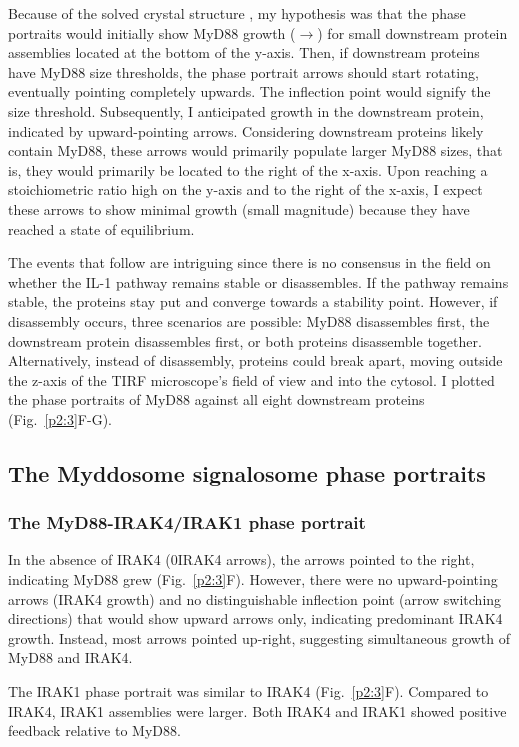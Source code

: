Because of the solved crystal structure \autocite{Lin_2010}, my hypothesis was that the phase portraits would initially show MyD88 growth ($\rightarrow$) for small downstream protein assemblies located at the bottom of the y-axis. Then, if downstream proteins have MyD88 size thresholds, the phase portrait arrows should start rotating, eventually pointing completely upwards. The inflection point would signify the size threshold. Subsequently, I anticipated growth in the downstream protein, indicated by upward-pointing arrows. Considering downstream proteins likely contain MyD88, these arrows would primarily populate larger MyD88 sizes, that is, they would primarily be located to the right of the x-axis. Upon reaching a stoichiometric ratio high on the y-axis and to the right of the x-axis, I expect these arrows to show minimal growth (small magnitude) because they have reached a state of equilibrium.

The events that follow are intriguing since there is no consensus in the field on whether the IL-1 pathway remains stable or disassembles. If the pathway remains stable, the proteins stay put and converge towards a stability point. However, if disassembly occurs, three scenarios are possible: MyD88 disassembles first, the downstream protein disassembles first, or both proteins disassemble together. Alternatively, instead of disassembly, proteins could break apart, moving outside the z-axis of the TIRF microscope’s field of view and into the cytosol. I plotted the phase portraits of MyD88 against all eight downstream proteins (Fig.~\ref{p2:3}F-G). 

\subsection{The Myddosome signalosome phase portraits}
\subsubsection{The MyD88-IRAK4/IRAK1 phase portrait}
In the absence of IRAK4 (0\times IRAK4 arrows), the arrows pointed to the right, indicating MyD88 grew (Fig.~\ref{p2:3}F). However, there were no upward-pointing arrows (IRAK4 growth) and no distinguishable inflection point (arrow switching directions) that would show upward arrows only, indicating predominant IRAK4 growth. Instead, most arrows pointed up-right, suggesting simultaneous growth of MyD88 and IRAK4.

The IRAK1 phase portrait was similar to IRAK4 (Fig.~\ref{p2:3}F). Compared to IRAK4, IRAK1 assemblies were larger. Both IRAK4 and IRAK1 showed positive feedback relative to MyD88.

